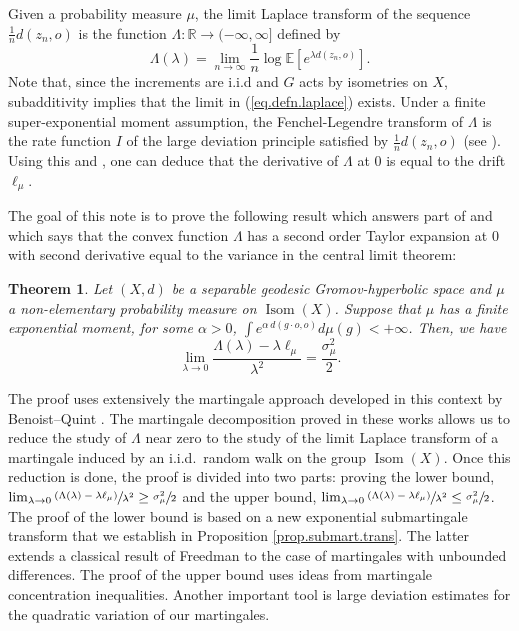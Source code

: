 \documentclass[10pt]{amsart}
\newcommand{\psfrac}[2]{\sfrac{(#1)}{#2}}
\theoremstyle{plain}
\newtheorem{theorem}{Theorem}[section]
\theoremstyle{definition}
\newcommand\R{\mathbb{R}}
\DeclareMathOperator\Isom{Isom}
\begin{document}
Given a probability measure $\mu$, the limit Laplace transform of the sequence $\frac{1}{n}d(z_n,o)$ is the function $\Lambda:\R \to (-\infty,\infty]$ defined by\vspace*{-3pt}\enlargethispage{.5\baselineskip}
\begin{equation}\label{eq.defn.laplace}
\Lambda(\lambda)=\lim_{n \to \infty} \frac{1}{n} \log \mathbb{E}[e^{\lambda d(z_n,o)}].
\end{equation}
Note that, since the increments are i.i.d and $G$ acts by isometries on $X$, subadditivity implies that the limit in (\ref{eq.defn.laplace}) exists. Under a finite super-exponential moment assumption, the Fenchel-Legendre transform of $\Lambda$ is the rate function $I$ of the large deviation principle satisfied by $\frac{1}{n}d(z_n, o)$ (see \cite[Lem.\,C.2]{BMSS}).
Using this and \cite[Th.\,1.1]{BMSS}, one can deduce that the derivative of $\Lambda$ at 0 is equal to the drift $\ell_{\mu}$.

The goal of this note is to prove the following result which answers part of \hbox{\cite[Quest.\,C.1]{BMSS}} and which says that the convex function $\Lambda$ has a second order Taylor expan\-sion at $0$ with second derivative equal to the variance in the central limit theorem:

\begin{theorem}\label{thm.main}
Let $(X,d)$ be a separable geodesic Gromov-hyperbolic space and $\mu$ a non-elementary probability measure on $\Isom(X)$. Suppose that $\mu$ has a finite exponential moment, \ie for some $\alpha>0$, $\int{e^{\alpha \,d(g\cdot o, o)} d\mu(g)}<+\infty$. Then, we have\vspace*{-3pt}
\[
\lim_{\lambda\to 0} \frac{\Lambda(\lambda)-\lambda \ell_\mu}{\lambda^2}=\frac{\sigma_\mu^2}{2}.
\]
\end{theorem}


The proof uses extensively the martingale approach developed in this context by Benoist--Quint \cite{BQ.CLT,BQ.hyperbolic}. The martingale decomposition proved in these works allows us to reduce the study of $\Lambda$ near zero to the study of the limit Laplace transform of a martingale induced by an i.i.d.\ random walk on the group $\Isom(X)$. Once this reduction is done, the proof is divided into two parts: proving the lower bound, \ie $\lim_{\lambda\to 0} \psfrac{\Lambda(\lambda)-\lambda \ell_\mu}{\lambda^2}\geq \sfrac{\sigma_\mu^2}{2}$ and the upper bound, \ie $\lim_{\lambda\to 0} \psfrac{\Lambda(\lambda)-\lambda \ell_\mu}{\lambda^2}\leq \sfrac{\sigma_\mu^2}{2}$.
The proof of the lower bound is based on a new exponential submartingale transform that we establish in Proposition \ref{prop.submart.trans}. The latter extends a classical result of Freedman \cite{Freedman} to the case of martingales with unbounded differences. The proof of the upper bound
uses ideas from martingale concentration inequalities. Another important tool is large deviation estimates for the quadratic variation of our martingales.
\end{document}
